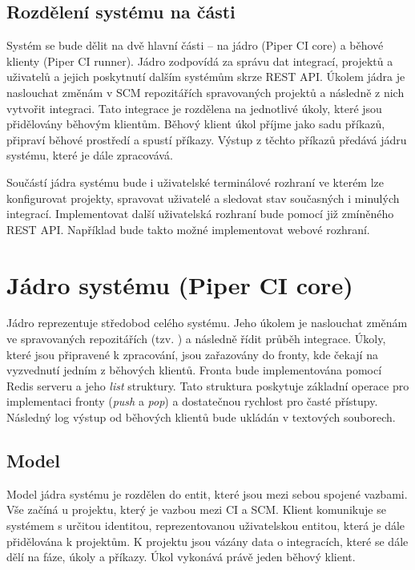 \subsection{Rozdělení systému na části}

Systém se bude dělit na dvě hlavní části -- na jádro (Piper CI core) a běhové klienty (Piper CI runner).
Jádro zodpovídá za správu dat integrací, projektů a uživatelů a jejich poskytnutí dalším systémům skrze REST API.
Úkolem jádra je naslouchat změnám v SCM repozitářích spravovaných projektů a následně z nich vytvořit integraci.
Tato integrace je rozdělena na jednotlivé úkoly, které jsou přidělovány běhovým klientům.
Běhový klient úkol příjme jako sadu příkazů, připraví běhové prostředí a spustí příkazy.
Výstup z těchto příkazů předává jádru systému, které je dále zpracovává.


Součástí jádra systému bude i uživatelské terminálové rozhraní ve kterém lze konfigurovat projekty, spravovat uživatelé a sledovat stav současných i minulých integrací.
Implementovat další uživatelská rozhraní bude pomocí již zmíněného REST API.
Například bude takto možné implementovat webové rozhraní.

\section{Jádro systému (Piper CI core)}

Jádro reprezentuje středobod celého systému.
Jeho úkolem je naslouchat změnám ve spravovaných repozitářích (tzv. ) a následně řídit průběh integrace.
Úkoly, které jsou připravené k zpracování, jsou zařazovány do fronty, kde čekají na vyzvednutí jedním z běhových klientů.
Fronta bude implementována pomocí Redis serveru a jeho \textit{list} struktury.
Tato struktura poskytuje základní operace pro implementaci fronty (\textit{push} a \textit{pop}) a dostatečnou rychlost pro časté přístupy.
Následný log výstup od běhových klientů bude ukládán v textových souborech.

\subsection{Model}

Model jádra systému je rozdělen do entit, které jsou mezi sebou spojené vazbami.
Vše začíná u projektu, který je vazbou mezi CI a SCM.
Klient komunikuje se systémem s určitou identitou, reprezentovanou uživatelskou entitou, která je dále přidělována k projektům.
K projektu jsou vázány data o integracích, které se dále dělí na fáze, úkoly a příkazy.
Úkol vykonává právě jeden běhový klient.

